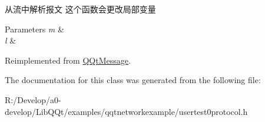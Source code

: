 从流中解析报文 这个函数会更改局部变量 


\begin{DoxyParams}{Parameters}
{\em m} & \\
\hline
{\em l} & \\
\hline
\end{DoxyParams}


Reimplemented from \mbox{\hyperlink{class_q_qt_message_a0bc25669bdd61490b1d8df6d77565f31}{Q\+Qt\+Message}}.



The documentation for this class was generated from the following file\+:\begin{DoxyCompactItemize}
\item 
R\+:/\+Develop/a0-\/develop/\+Lib\+Q\+Qt/examples/qqtnetworkexample/usertest0protocol.\+h\end{DoxyCompactItemize}
